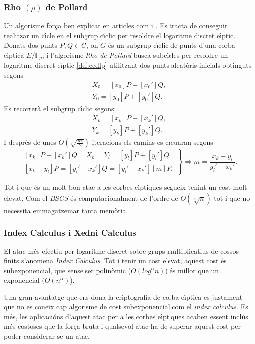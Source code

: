 \documentclass[12pt,twoside,catalan,a4paper]{book}%
\numberwithin{figure}{section}		%
\theoremstyle{definition}   			%
\def\ce{corba e\lgem{}\'{\i}ptica}%
\def\ces{corbes e\lgem{}\'{\i}ptiques}%
\def\cfs{cossos finits}%
\def\sgc{subgrup c\'{\i}clic}%
\def\ecdlp{logaritme discret e\lgem{}\'{\i}ptic}%
\newcommand{\EFpbis}{\ensuremath{E/\mathbb{F}_p}}
\theoremstyle{saltolinea}   			%
\begin{document}
\subsubsection{Rho $\left(\rho\right)$ de Pollard}
Un algorisme for\c{c}a ben explicat en articles com \cite{H9DL} i \cite{LMS317}. Es tracta de conseguir realitzar un c\'{\i}cle en el \sgc{} per resoldre el \ecdlp. Donats dos punts $P,Q \in G$, on $G$ \'es un \sgc{} de punts d'una \ce{} \EFpbis, i l'algorisme \emph{Rho de Pollard} busca subc\'{\i}cles per resoldre un \ecdlp{} \ref{def:ecdlp} utilitzant dos punts aleat\`oris inicials obtinguts segons
$$\begin{array}{c} X_{0} = \left[x_{0}\right]P+\left[x_{0}'\right]Q,\\ Y_{0} = \left[y_{0}\right]P+\left[y_{0}'\right]Q.\end{array}$$
Es recorrer\`a el \sgc{} segons:
$$\begin{array}{c} X_{k} = \left[x_{k}\right]P+\left[x_{k}'\right]Q,\\ Y_{k} = \left[y_{k}\right]P+\left[y_{k}'\right]Q.\end{array}$$
I despr\'es de unes $O\left(\sqrt{\frac{n\pi}{2}}\right)$ iteracions els camins es creuaran segons
$$\left.\begin{array}{c} \left[x_{k}\right]P+\left[x_{k}'\right]Q = X_{k} = Y_{l} = \left[y_{l}\right]P+\left[y_{l}'\right]Q,\\ \left[x_{k}-y_{l}\right]P = \left[y_{l}'-x_{k}'\right]Q = \left[y_{l}'-x_{k}'\right]\left[m\right]P,\end{array}\right\}\Longrightarrow m=\frac{x_k-y_l}{y_l'-x_k'}.$$

Tot i que \'es un molt bon atac a les \ces{} segueix tenint un cost molt elevat. Com el \emph{BSGS} \'es computacionalment de l'ordre de $O\left(\sqrt[4]{n}\right)$ tot i que no necessita emmagatzemar tanta mem\`oria.

\subsubsection{Index Calculus i Xedni Calculus}

El atac m\'es efectiu per logaritme discret sobre grups multiplicatius de \cfs{} s'anomena \emph{Index Calculus}. Tot i tenir un cost elevat, aquest cost \'es subexponencial, que sense ser polin\`omic ($O\left( log^{\alpha}n\right)$) \'es millor que un exponencial ($O\left( n^{\alpha}\right)$).

Una gran avantatge que ens dona la criptografia de \ce{} es justament que no es coneix cap algorisme de cost subexponencial com el \emph{index calculus}. Es m\'es, les aplicaci\'ons d'aquest atac per a les \ces{} acaben essent incl\'us m\'es costoses que la for\c{c}a bruta i qualsevol atac ha de superar aquest cost per poder considerar-se un atac.
\end{document}
